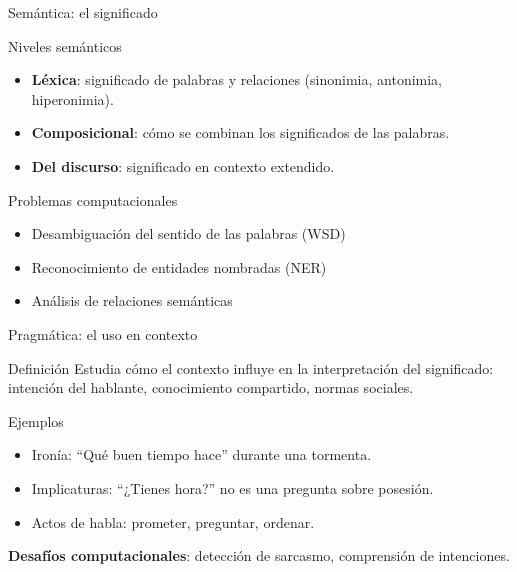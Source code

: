 \documentclass[aspectratio=169, 10pt, xcolor=table]{beamer}
\begin{document}
\begin{frame}{Semántica: el significado}
    \begin{block}{Niveles semánticos}
        \begin{itemize}
            \item \textbf{Léxica}: significado de palabras y relaciones (sinonimia, antonimia, hiperonimia).
            \item \textbf{Composicional}: cómo se combinan los significados de las palabras.
            \item \textbf{Del discurso}: significado en contexto extendido.
        \end{itemize}
    \end{block}
    \begin{exampleblock}{Problemas computacionales}
        \begin{itemize}
            \item Desambiguación del sentido de las palabras (WSD)
            \item Reconocimiento de entidades nombradas (NER)
            \item Análisis de relaciones semánticas
        \end{itemize}
    \end{exampleblock}
\end{frame}

\begin{frame}{Pragmática: el uso en contexto}
    \begin{block}{Definición}
        Estudia cómo el contexto influye en la interpretación del significado: intención del hablante, conocimiento compartido, normas sociales.
    \end{block}
    \begin{exampleblock}{Ejemplos}
        \begin{itemize}
            \item Ironía: ``Qué buen tiempo hace'' durante una tormenta.
            \item Implicaturas: ``¿Tienes hora?'' no es una pregunta sobre posesión.
            \item Actos de habla: prometer, preguntar, ordenar.
        \end{itemize}
    \end{exampleblock}
    \textbf{Desafíos computacionales}: detección de sarcasmo, comprensión de intenciones.
\end{frame}
\end{document}
